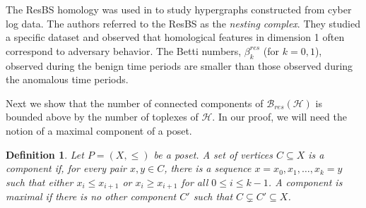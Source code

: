\documentclass{amsart}
\newtheorem{definition}[theorem]{Definition}
\newcommand{\betti}[2]{\beta_{#2}^{#1}}
\renewcommand{\H}{\mathcal{H}}
\newcommand{\bary}{\mathcal{B}}
\begin{document}
The ResBS homology was used in \cite{jenne2023stepping} to study hypergraphs constructed from cyber log data. 
The authors referred to the ResBS as the \emph{nesting complex}.
They studied a specific dataset and observed that homological features in dimension 1 often correspond to adversary behavior. The Betti numbers, $\betti{res}{k}$ (for $k=0,1$), observed during the benign time periods are smaller than those observed during the anomalous time periods.

Next we show that the number of connected components of $\bary_{res}(\H)$ is bounded above by the number of toplexes of $\H$. 
In our proof, we will need the notion of a maximal component of a poset.

\begin{definition}
Let $P=(X, \leq)$ be a poset. A set of vertices $C \subseteq X$ is a \emph{component} if, for every pair $x, y \in C$, there is a sequence $x=x_0, x_1, \ldots, x_k=y$ such that either $x_i \leq x_{i+1}$ or $x_i \geq x_{i+1}$ for all $0\leq i\leq k-1$. A component is \emph{maximal} if there is no other component $C'$ such that $C \subsetneq C' \subseteq X$.
\end{definition}
\end{document}
